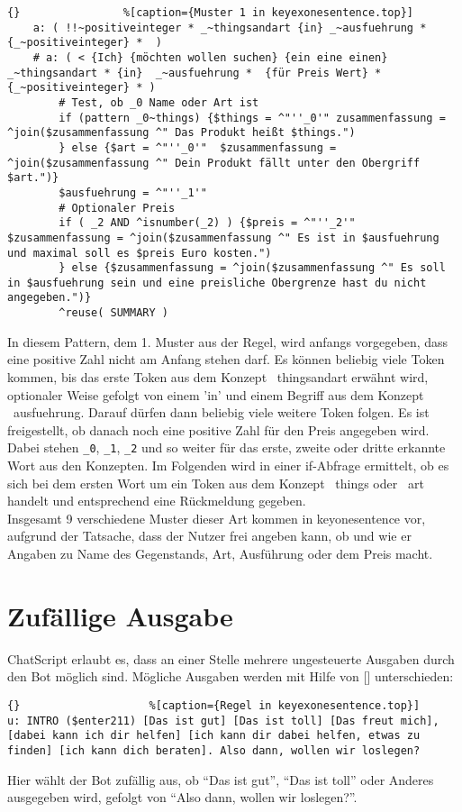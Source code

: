 \begin{lstlisting}{}				%[caption={Muster 1 in keyexonesentence.top}]
    a: ( !!~positiveinteger * _~thingsandart {in} _~ausfuehrung * {_~positiveinteger} *  )
    # a: ( < {Ich} {möchten wollen suchen} {ein eine einen} _~thingsandart * {in}  _~ausfuehrung *  {für Preis Wert} * {_~positiveinteger} * )
        # Test, ob _0 Name oder Art ist
        if (pattern _0~things) {$things = ^"''_0'" zusammenfassung = ^join($zusammenfassung ^" Das Produkt heißt $things.")
        } else {$art = ^"''_0'"  $zusammenfassung = ^join($zusammenfassung ^" Dein Produkt fällt unter den Obergriff $art.")}
        $ausfuehrung = ^"''_1'"
        # Optionaler Preis
        if ( _2 AND ^isnumber(_2) ) {$preis = ^"''_2'" $zusammenfassung = ^join($zusammenfassung ^" Es ist in $ausfuehrung und maximal soll es $preis Euro kosten.")
        } else {$zusammenfassung = ^join($zusammenfassung ^" Es soll in $ausfuehrung sein und eine preisliche Obergrenze hast du nicht angegeben.")}
        ^reuse( SUMMARY )
\end{lstlisting}
        
In diesem Pattern, dem 1. Muster aus der Regel, wird anfangs vorgegeben, dass eine positive Zahl nicht am Anfang stehen darf. Es können beliebig viele Token kommen, bis das erste Token aus dem Konzept ~thingsandart erwähnt wird, optionaler Weise gefolgt von einem 'in' und einem Begriff aus dem Konzept ~ausfuehrung. Darauf dürfen dann beliebig viele weitere Token folgen. Es ist freigestellt, ob danach noch eine positive Zahl für den Preis angegeben wird.\\
Dabei stehen \lstinline|_0|, \lstinline|_1|, \lstinline|_2| und so weiter für das erste, zweite oder dritte erkannte Wort aus den Konzepten. Im Folgenden wird in einer if-Abfrage ermittelt, ob es sich bei dem ersten Wort um ein Token aus dem Konzept ~things oder ~art handelt und entsprechend eine Rückmeldung gegeben.\\ 
Insgesamt 9 verschiedene Muster dieser Art kommen in keyonesentence vor, aufgrund der Tatsache, dass der Nutzer frei angeben kann, ob und wie er Angaben zu Name des Gegenstands, Art, Ausführung oder dem Preis macht.\\


\section{Zufällige Ausgabe}
\label{sec:ChatScript: Zufällige Ausgabe}

ChatScript erlaubt es, dass an einer Stelle mehrere ungesteuerte Ausgaben durch den Bot möglich sind. Mögliche Ausgaben werden mit Hilfe von [] unterschieden:

\begin{lstlisting}{}					%[caption={Regel in keyexonesentence.top}]
u: INTRO ($enter211) [Das ist gut] [Das ist toll] [Das freut mich], [dabei kann ich dir helfen] [ich kann dir dabei helfen, etwas zu finden] [ich kann dich beraten]. Also dann, wollen wir loslegen?
\end{lstlisting}

Hier wählt der Bot zufällig aus, ob "`Das ist gut"', "`Das ist toll"' oder Anderes ausgegeben wird, gefolgt von "`Also dann, wollen wir loslegen?"'.